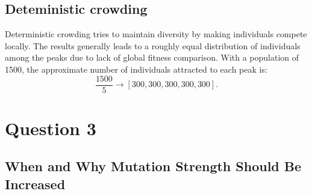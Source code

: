 \documentclass[12pt,letterpaper]{article}
\begin{document}
\subsection*{Deteministic crowding}
Deterministic crowding tries to maintain diversity by making individuals compete locally. 
The results generally leads to a roughly equal distribution of individuals among the peaks due to lack of global fitness comparison.
With a population of 1500, the approximate number of individuals attracted to each peak is:
\[
\frac{1500}{5} \rightarrow \left[300, 300, 300, 300, 300\right].
\]

\section*{Question 3}
\subsection*{When and Why Mutation Strength Should Be Increased}
\end{document}
